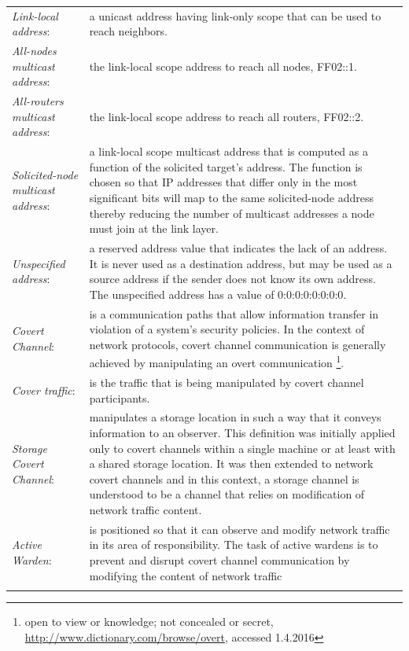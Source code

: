\documentclass[12pt]{article}
\begin{document}
\begin{savenotes}
\begin{tabular}{L{3.3cm}L{12cm}}
\hdashline
\textit{Link-local address}:&a unicast address having link-only scope that can be used to reach neighbors\cite{rfc4861}.\\
\hdashline
\textit{All-nodes multicast address}:&the link-local scope address to reach all nodes, FF02::1\cite{rfc4861}.\\
\hdashline
\textit{All-routers multicast address}:&the link-local scope address to reach all routers, FF02::2\cite{rfc4861}.\\
\hdashline
\textit{Solicited-node multicast address}:&a link-local scope multicast address that is computed as a function of the solicited target's address. The function is chosen so that IP addresses that differ only in the most significant bits will map to the same solicited-node address thereby reducing the number of multicast addresses a node must join at the link layer\cite{rfc4861}.\\
\hdashline
\textit{Unspecified address}:&a reserved address value that indicates the lack of an address. It is never used as a destination address, but may be used as a source address if the sender does not know its own address. The 
unspecified address has a value of 0:0:0:0:0:0:0:0\cite{rfc4861}.\\
\hdashline
\textit{Covert Channel}:&is a communication paths that allow information transfer in violation of a system’s security policies. In the context of network protocols, covert channel communication is generally achieved by manipulating an overt communication\cite{lewandowski} \footnote{open to view or knowledge; not concealed or secret, \url{http://www.dictionary.com/browse/overt}, accessed 1.4.2016}.\\
\hdashline
\textit{Cover traffic}:&is the traffic that is being manipulated by covert channel participants\cite{lewandowski}.\\
\hdashline
\textit{Storage Covert Channel}:&manipulates a storage location in such a way that it conveys information to an observer. This definition was initially applied only to covert channels within a single machine or at least with a shared storage location. It was then extended to network covert channels and in this context, a storage channel is understood to be a channel that relies on modification of network traffic content\cite{lewandowski}.\\
\hdashline
\textit{Active Warden}:&is positioned so that it can observe and modify network traffic in its area of responsibility. The task of active wardens is to prevent and disrupt covert channel communication by modifying the content of network traffic\cite{lewandowski}\\
\hdashline
\end{tabular}
\end{savenotes}
\end{document}
